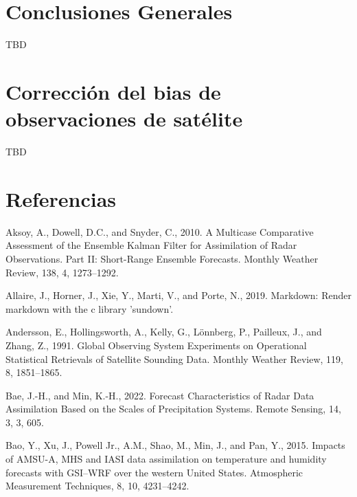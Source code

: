 \documentclass[12pt,oneside]{reedthesis}
\begin{document}
\hypertarget{conclusiones-generales}{%
\chapter*{Conclusiones Generales}\label{conclusiones-generales}}

TBD

\appendix

\hypertarget{correcciuxf3n-del-bias-de-observaciones-de-satuxe9lite}{%
\chapter{Corrección del bias de observaciones de satélite}\label{correcciuxf3n-del-bias-de-observaciones-de-satuxe9lite}}

TBD

\backmatter

\hypertarget{referencias}{%
\chapter*{Referencias}\label{referencias}}


\noindent

\setlength{\parindent}{-0.20in}

\hypertarget{refs}{}
\leavevmode\hypertarget{ref-aksoy2010}{}%
Aksoy, A., Dowell, D.C., and Snyder, C., 2010. A Multicase Comparative Assessment of the Ensemble Kalman Filter for Assimilation of Radar Observations. Part II: Short-Range Ensemble Forecasts. Monthly Weather Review, 138, 4, 1273--1292.

\leavevmode\hypertarget{ref-allaire2019}{}%
Allaire, J., Horner, J., Xie, Y., Marti, V., and Porte, N., 2019. Markdown: Render markdown with the c library 'sundown'.

\leavevmode\hypertarget{ref-andersson1991}{}%
Andersson, E., Hollingsworth, A., Kelly, G., Lönnberg, P., Pailleux, J., and Zhang, Z., 1991. Global Observing System Experiments on Operational Statistical Retrievals of Satellite Sounding Data. Monthly Weather Review, 119, 8, 1851--1865.

\leavevmode\hypertarget{ref-bae2022}{}%
Bae, J.-H., and Min, K.-H., 2022. Forecast Characteristics of Radar Data Assimilation Based on the Scales of Precipitation Systems. Remote Sensing, 14, 3, 3, 605.

\leavevmode\hypertarget{ref-bao2015}{}%
Bao, Y., Xu, J., Powell Jr., A.M., Shao, M., Min, J., and Pan, Y., 2015. Impacts of AMSU-A, MHS and IASI data assimilation on temperature and humidity forecasts with GSI--WRF over the western United States. Atmospheric Measurement Techniques, 8, 10, 4231--4242.
\end{document}
